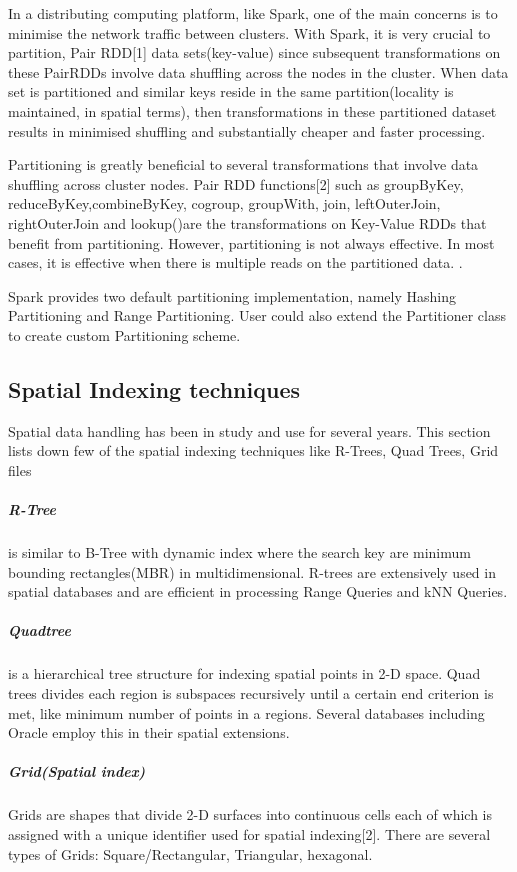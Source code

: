 \documentclass[article,type=msc,colorback,10pt,accentcolor=tud1d]{tudthesis}
\begin{document}
		   In a distributing computing platform, like Spark, one of the main concerns is to minimise the network traffic between clusters. With Spark, it is very crucial to partition, Pair RDD[1] data sets(key-value) since subsequent transformations on these PairRDDs involve data shuffling across the nodes in the cluster. When data set is partitioned and similar keys reside in the same partition(locality is maintained, in spatial terms), then transformations in these partitioned dataset results in minimised shuffling and substantially cheaper and faster processing.  
		   
		   Partitioning is greatly beneficial to several transformations that involve data shuffling across cluster nodes. Pair RDD functions[2] such as groupByKey, reduceByKey,combineByKey, cogroup, groupWith, join, leftOuterJoin, rightOuterJoin and lookup()are the transformations on Key-Value RDDs that benefit from partitioning. However, partitioning is not always effective. In most cases, it is effective when there is multiple reads on the partitioned data. \cite{spark_book}.
		   
		   Spark provides two default partitioning implementation, namely Hashing Partitioning and Range Partitioning. User could also extend the Partitioner class to create custom Partitioning scheme. 
		   
		   
		   
		   \subsection{Spatial Indexing techniques}
		   
		   Spatial data handling has been in study and use for several years. This section lists down few of the spatial indexing techniques like R-Trees, Quad Trees, Grid files
		   
		   \subparagraph{R-Tree} is similar to B-Tree with dynamic index where the search key are minimum bounding rectangles(MBR) in multidimensional. R-trees are extensively used in spatial databases and are efficient in processing Range Queries and kNN Queries.
		   
		   \subparagraph{Quadtree} is a hierarchical tree structure for indexing spatial points in 2-D space. Quad trees divides each region is subspaces recursively until a certain end criterion is met, like minimum number of points in a regions. Several databases including Oracle employ this in their spatial extensions.
		   
		   \subparagraph{Grid(Spatial index)} Grids are shapes that divide 2-D surfaces into continuous cells each of which is assigned with a unique identifier used for spatial indexing[2]. There are several types of Grids: Square/Rectangular, Triangular, hexagonal.
		   
\end{document}
